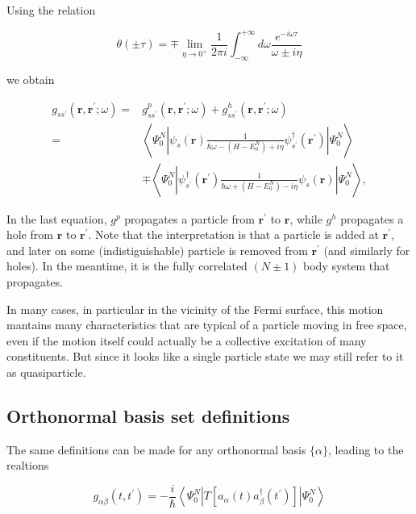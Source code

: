 {Using the relation

$$
\theta( \pm \tau)=\mp \lim _{\eta \rightarrow 0^{+}} \frac{1}{2 \pi i} \int_{-\infty}^{+\infty} d \omega \frac{e^{-i \omega \tau}}{\omega \pm i \eta}
$$

we obtain

$$
\begin{aligned}
g_{s s^{\prime}}\left(\mathbf{r}, \mathbf{r}^{\prime} ; \omega\right)= & g_{s s^{\prime}}^{p}\left(\mathbf{r}, \mathbf{r}^{\prime} ; \omega\right)+g_{s s^{\prime}}^{h}\left(\mathbf{r}, \mathbf{r}^{\prime} ; \omega\right) \\
= & \left\langle\Psi_{0}^{N}\left|\psi_{s}(\mathbf{r}) \frac{1}{\hbar \omega-\left(H-E_{0}^{N}\right)+i \eta} \psi_{s^{\prime}}^{\dagger}\left(\mathbf{r}^{\prime}\right)\right| \Psi_{0}^{N}\right\rangle \\
& \mp\left\langle\Psi_{0}^{N}\left|\psi_{s^{\prime}}^{\dagger}\left(\mathbf{r}^{\prime}\right) \frac{1}{\hbar \omega+\left(H-E_{0}^{N}\right)-i \eta} \psi_{s}(\mathbf{r})\right| \Psi_{0}^{N}\right\rangle,
\end{aligned}
$$

In the last equation, $g^{p}$ propagates a particle from
$\mathbf{r}^{\prime}$ to $\mathbf{r}$, while $g^{h}$ propagates a hole
from $\mathbf{r}$ to $\mathbf{r}^{\prime}$. Note that the
interpretation is that a particle is added at $\mathbf{r}^{\prime}$,
and later on some (indistiguishable) particle is removed from
$\mathbf{r}^{\prime}$ (and similarly for holes). In the meantime, it
is the fully correlated $(N \pm 1)$ body system that propagates.

In many cases,  in particular in
the vicinity of the Fermi surface, this motion mantains many
characteristics that are typical of a particle moving in free space,
even if the motion itself could actually be a collective excitation of
many constituents. But since it looks like a single particle state we
may still refer to it as quasiparticle.

{
\subsection{Orthonormal basis set definitions}

The same definitions can be made for any orthonormal basis $\{\alpha\}$, leading to the realtions

$$
g_{\alpha \beta}\left(t, t^{\prime}\right)=-\frac{i}{\hbar}\left\langle\Psi_{0}^{N}\left|T\left[a_{\alpha}(t) a_{\beta}^{\dagger}\left(t^{\prime}\right)\right]\right| \Psi_{0}^{N}\right\rangle
$$

}}
